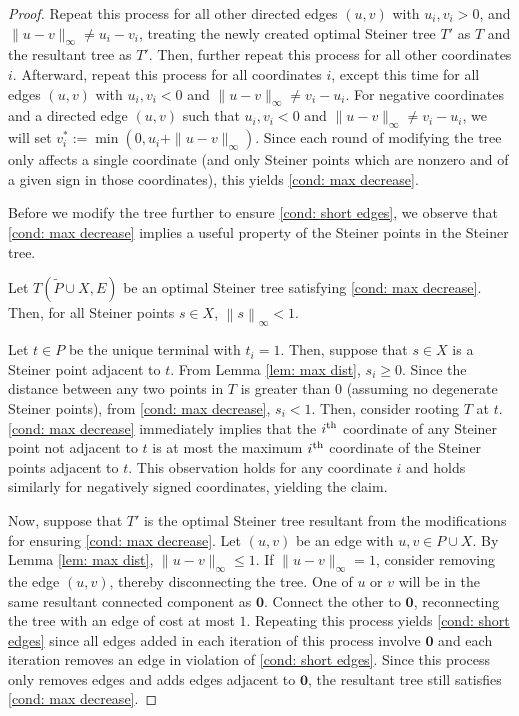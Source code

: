 \documentclass{article}\providecommand{\DeclareRedundantLanguages}[2]{}\usepackage[a4paper,margin=20mm]{geometry}
\newcommand{\1}{\textbf{1}}
\newcommand{\norm}[1]{\left\lVert#1\right\rVert}
\renewcommand{\tilde}{\widetilde}
\begin{document}
\begin{proof}
Repeat this process for all other directed edges $(u,v)$ with  $u_i, v_i > 0$, and $\|u - v\|_{\infty} \neq u_i - v_i$, treating the newly created optimal Steiner tree $T'$ as $T$ and the resultant tree as $T'$. Then, further repeat this process for all other coordinates $i$. Afterward, repeat this process for all coordinates $i$, except this time for all edges $(u,v)$ with $u_i, v_i < 0$ and  $\|u - v\|_{\infty} \neq  v_i - u_i$. For negative coordinates and a directed edge $(u,v)$ such that $u_i, v_i < 0$ and $\|u -v\|_{\infty} \neq v_i - u_i$, we will set $v_i^* := \min(0, u_i + \|u-v\|_{\infty})$. Since each round of modifying the tree only affects a single coordinate (and only Steiner points which are nonzero and of a given sign in those coordinates), this yields \ref{cond: max decrease}. 

Before we modify the tree further to ensure \ref{cond: short edges}, we observe that \ref{cond: max decrease} implies a useful property of the Steiner points in the Steiner tree.
\begin{claim} \label{cla: Steiner point magnitude less than 1}
Let $T(\tilde{P} \cup X, E)$ be an optimal Steiner tree satisfying \ref{cond: max decrease}. Then, for all Steiner points $s \in X$, $\norm{s}_{\infty} < 1.$
\end{claim}
\begin{subproof}
Let $t \in P$ be the unique terminal with $t_i = 1$. Then, suppose that $s \in X$ is a Steiner point adjacent to $t$. From Lemma \ref{lem: max dist}, $s_i \geq 0$. Since the distance between any two points in $T$ is greater than $0$ (assuming no degenerate Steiner points), from \ref{cond: max decrease}, $s_i < 1$. Then, consider rooting $T$ at $t$. \ref{cond: max decrease} immediately implies that the $i\textsuperscript{th} $ coordinate of any Steiner point not adjacent to $t$ is at most the maximum $i\textsuperscript{th} $ coordinate of the Steiner points adjacent to $t$. This observation holds for any coordinate $i$ and holds similarly for negatively signed coordinates, yielding the claim.
\end{subproof}

Now, suppose that $T'$ is the optimal Steiner tree resultant from the modifications for ensuring \ref{cond: max decrease}. Let $(u,v)$ be an edge with $u,v \in P \cup X$. By Lemma \ref{lem: max dist}, $\|u - v\|_{\infty} \leq 1$. If $\|u - v\|_{\infty} = 1$, consider removing the edge $(u,v)$, thereby disconnecting the tree. One of $u$ or $v$ will be in the same resultant connected component as $\mathbf{0}$. Connect the other to $\mathbf{0}$, reconnecting the tree with an edge of cost at most $1$. Repeating this process yields \ref{cond: short edges} since all edges added in each iteration of this process involve $\mathbf{0}$ and each iteration removes an edge in violation of \ref{cond: short edges}. Since this process only removes edges and adds edges adjacent to $\mathbf{0}$,  the resultant tree still satisfies \ref{cond: max decrease}.
\end{proof}
\end{document}
